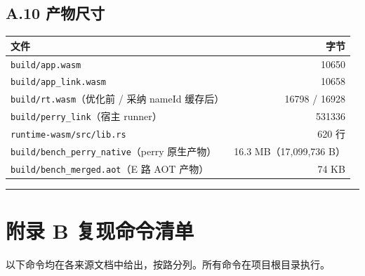 \documentclass[11pt, a4paper]{article}
\begin{document}
\subsection{A.10 产物尺寸}

\begin{center}\small\begin{tabular}{lr}
\toprule
文件 & 字节 \\
\midrule
\texttt{build/app.wasm} & 10650 \\
\texttt{build/app\_link.wasm} & 10658 \\
\texttt{build/rt.wasm}（优化前 / 采纳 nameId 缓存后） & 16798 / 16928 \\
\texttt{build/perry\_link}（宿主 runner） & 531336 \\
\texttt{runtime-wasm/src/lib.rs} & 620 行 \\
\texttt{build/bench\_perry\_native}（perry 原生产物） & 16.3 MB（17,099,736 B） \\
\texttt{build/bench\_merged.aot}（E 路 AOT 产物） & 74 KB \\
\bottomrule
\end{tabular}\end{center}


\bigskip\hrule\bigskip

\section{附录 B 复现命令清单}

以下命令均在各来源文档中给出，按路分列。所有命令在项目根目录执行。
\end{document}
